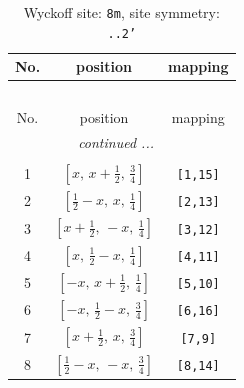 \documentclass[fleqn,8pt]{jsarticle}
\begin{document}
\begin{longtable}{ccc}
\caption{Wyckoff site: {\tt 8m}, site symmetry: {\tt ..2'}}
 \\
 \hline \hline
No. & position & mapping \\ \hline \endfirsthead

\multicolumn{2}{l}{\tablename\ \thetable{}} \\
 \hline \hline
No. & position & mapping \\ \hline \endhead

 \hline \hline
\multicolumn{2}{r}{\footnotesize\it continued ...} \\ \endfoot

 \hline \hline
\multicolumn{2}{r}{} \\ \endlastfoot

1 & $\left[ x,\, x + \frac{1}{2},\, \frac{3}{4} \right]$ & {\tt [1,15]} \\ \hline
2 & $\left[ \frac{1}{2} - x,\, x,\, \frac{1}{4} \right]$ & {\tt [2,13]} \\ \hline
3 & $\left[ x + \frac{1}{2},\, - x,\, \frac{1}{4} \right]$ & {\tt [3,12]} \\ \hline
4 & $\left[ x,\, \frac{1}{2} - x,\, \frac{1}{4} \right]$ & {\tt [4,11]} \\ \hline
5 & $\left[ - x,\, x + \frac{1}{2},\, \frac{1}{4} \right]$ & {\tt [5,10]} \\ \hline
6 & $\left[ - x,\, \frac{1}{2} - x,\, \frac{3}{4} \right]$ & {\tt [6,16]} \\ \hline
7 & $\left[ x + \frac{1}{2},\, x,\, \frac{3}{4} \right]$ & {\tt [7,9]} \\ \hline
8 & $\left[ \frac{1}{2} - x,\, - x,\, \frac{3}{4} \right]$ & {\tt [8,14]} \\
\end{longtable}
\renewcommand{\arraystretch}{1.2}
\end{document}
